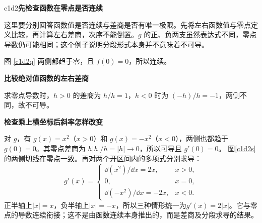 \begin{drillsolution}{c1d2}\textbf{先检查函数在零点是否连续}\par\nobreak
这里要分别回答函数值是否连续与差商是否有唯一极限。先将左右函数值与零点定义比较，再计算左右差商，次序不能倒置。$g$ 的正、负两支虽然表达式不同，零点导数仍可能相同；这个例子说明分段形式本身并不意味着不可导。

图 \ref{c1d2q} 两侧都趋于零，且 $f(0)=0$，所以连续。

\par\medskip{}\noindent\textbf{比较绝对值函数的左右差商}\par\nobreak
求零点导数时，$h>0$ 的差商为 $h/h=1$，$h<0$ 时为 $(-h)/h=-1$，两侧不同，故不可导。

\par\medskip{}\noindent\textbf{检查乘上横坐标后斜率怎样改变}\par\nobreak
对 $g$，有 $g(x)=x^2$（$x>0$）和 $g(x)=-x^2$（$x<0$），两侧也都趋于 $g(0)=0$。其零点差商为 $h|h|/h=|h|\to0$，所以可导且 $g'(0)=0$。
图\ref{c1d2s}的两侧切线在零点一致。再对两个开区间内的多项式分别求导：
\[
g'(x)=
\begin{cases}
\dd(x^2)/\dd x=2x,&x>0,\\
0,&x=0,\\
\dd(-x^2)/\dd x=-2x,&x<0.
\end{cases}
\]
正半轴上$|x|=x$，负半轴上$|x|=-x$，所以三种情形统一为$g'(x)=2|x|$。它与零点的导数连续衔接；这不是由函数连续本身推出的，而是差商及分段求导的结果。
\end{drillsolution}
